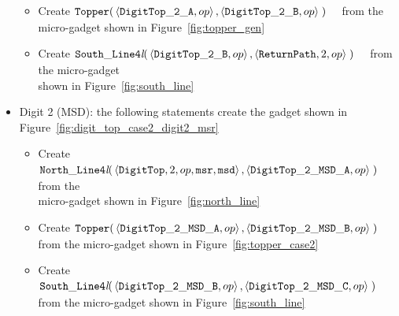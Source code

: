 \begin{itemize}
\begin{itemize}
            \item Create
            $\begin{aligned}[t]
                {\tt Topper}(& \left \langle {\tt DigitTop\_2\_A}, op \right\rangle,
                               \left \langle {\tt DigitTop\_2\_B}, op \right\rangle \;)
            \end{aligned}$ from the micro-gadget shown in Figure~\ref{fig:topper_gen}

            \item Create
            $\begin{aligned}[t]
                {\tt South\_Line4\textit{l}}(& \left\langle {\tt DigitTop\_2\_B}, op \right\rangle,
                                               \left\langle {\tt ReturnPath}, 2, op \right\rangle \;)
            \end{aligned}$ from the micro-gadget\\shown in Figure~\ref{fig:south_line}
        \end{itemize}
        \vspace{1cm}


        \item Digit 2 (MSD): the following statements create the gadget shown in Figure~\ref{fig:digit_top_case2_digit2_msr}
        \begin{itemize}
            \item Create
            $\begin{aligned}[t]
                {\tt North\_Line4\textit{l}}(& \left\langle {\tt DigitTop}, 2,          op, {\tt msr}, {\tt msd} \right\rangle,
                                               \left\langle {\tt DigitTop\_2\_MSD\_A},  op                       \right\rangle \;)
            \end{aligned}$ from the\\micro-gadget shown in Figure~\ref{fig:north_line}

            \item Create
            $\begin{aligned}[t]
                {\tt Topper}(& \left\langle {\tt DigitTop\_2\_MSD\_A}, op \right\rangle,
                               \left\langle {\tt DigitTop\_2\_MSD\_B}, op \right\rangle \;)
            \end{aligned}$ from the micro-gadget shown in Figure~\ref{fig:topper_case2}

            \item Create
            $\begin{aligned}[t]
                {\tt South\_Line4\textit{l}}(& \left\langle {\tt DigitTop\_2\_MSD\_B}, op \right\rangle,
                                               \left\langle {\tt DigitTop\_2\_MSD\_C}, op \right\rangle \;)
            \end{aligned}$ from the micro-gadget shown in Figure~\ref{fig:south_line}


\end{itemize}
\end{itemize}
